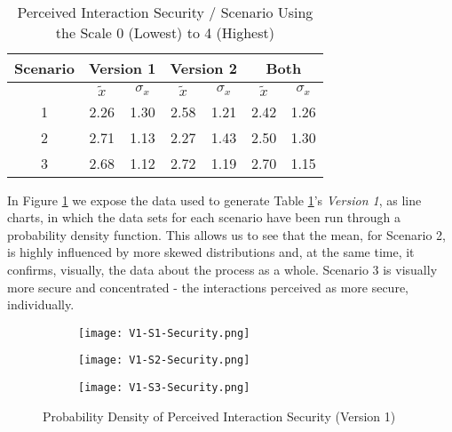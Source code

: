\begin{table}[htb]
	\centering
	\caption{Perceived Interaction Security / Scenario Using the Scale 0 (Lowest) to 4 (Highest)}
	\label{tab: perceivedInteractionSecurity}
	\begin{tabular}{c|cccc|cc}
		\hline
		Scenario & \multicolumn{2}{c}{\bf Version 1} & \multicolumn{2}{c}{\bf Version 2} \vrule & \multicolumn{2}{c}{\bf Both}                                             \\
		\hline
		         & $\tilde{x}$                       & $\sigma_{x}$                             & $\tilde{x}$                  & $\sigma_{x}$ & $\tilde{x}$ & $\sigma_{x}$ \\
		\hline
		1        & 2.26                              & 1.30                                     & 2.58                         & 1.21         & 2.42        & 1.26         \\
		2        & 2.71                              & 1.13                                     & 2.27                         & 1.43         & 2.50        & 1.30         \\
		3        & 2.68                              & 1.12                                     & 2.72                         & 1.19         & 2.70        & 1.15         \\
		\hline
	\end{tabular}
\end{table}

In Figure \ref{fig: perceivedInteractionSecurityOne} we expose the data used to generate Table \ref{tab: perceivedInteractionSecurity}'s \textit{Version 1}, as line charts, in which the data sets for each scenario have been run through a probability density function. This allows us to see that the mean, for Scenario 2, is highly influenced by more skewed distributions and, at the same time, it confirms, visually, the data about the process as a whole. Scenario 3 is visually more secure and concentrated - the interactions perceived as more secure, individually.

\begin{figure}[htb]
	\centering
	\begin{subfigure}[b]{0.49\textwidth}
		\centering
		\texttt{[image: V1-S1-Security.png]}
	\end{subfigure}
	\begin{subfigure}[b]{0.49\textwidth}
		\centering
		\texttt{[image: V1-S2-Security.png]}
	\end{subfigure}
	\hfill
	\begin{subfigure}[b]{0.49\textwidth}
		\centering
		\texttt{[image: V1-S3-Security.png]}
	\end{subfigure}

	\caption{Probability Density of Perceived Interaction Security (Version 1)}
	\label{fig: perceivedInteractionSecurityOne}
\end{figure}


